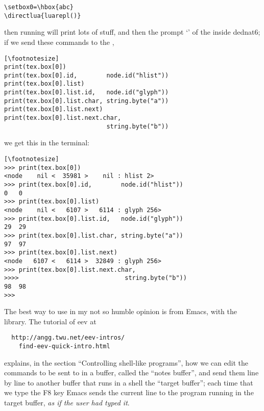 \documentclass{ltugboat}
\begin{document}
\begin{verbatim}
\setbox0=\hbox{abc}
\directlua{luarepl()}
\end{verbatim}
%
then running  will print lots of stuff, and then
the prompt `\co{>>>}' of the  inside dednat6; if we send
these commands to the ,

\begin{verbatim}[\footnotesize]
print(tex.box[0])
print(tex.box[0].id,        node.id("hlist"))
print(tex.box[0].list)
print(tex.box[0].list.id,   node.id("glyph"))
print(tex.box[0].list.char, string.byte("a"))
print(tex.box[0].list.next)
print(tex.box[0].list.next.char,
                            string.byte("b"))
\end{verbatim}
%
\newpage\noindent
we get this in the terminal:

\begin{verbatim}[\footnotesize]
>>> print(tex.box[0])
<node    nil <  35981 >    nil : hlist 2>
>>> print(tex.box[0].id,        node.id("hlist"))
0	0
>>> print(tex.box[0].list)
<node    nil <   6107 >   6114 : glyph 256>
>>> print(tex.box[0].list.id,   node.id("glyph"))
29	29
>>> print(tex.box[0].list.char, string.byte("a"))
97	97
>>> print(tex.box[0].list.next)
<node   6107 <   6114 >  32849 : glyph 256>
>>> print(tex.box[0].list.next.char,
>>>>                             string.byte("b"))
98	98
>>>
\end{verbatim}

The best way to use  \Dash in my not so humble opinion \Dash
is from Emacs, with the  library. The tutorial of eev at

\begin{verbatim}
  http://angg.twu.net/eev-intros/
    find-eev-quick-intro.html
\end{verbatim}
%
explains, in the section ``Controlling shell-like programs'', how we
can edit the commands to be sent to  in a buffer, called
the ``notes buffer'', and send them line by line to another buffer
that runs  in a shell \Dash the ``target buffer'';
each time that we type the F8 key Emacs sends the current line to the
program running in the target buffer, {\sl as if the user had typed
  it}.





\end{document}
